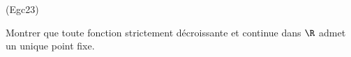 \begin{tiny}(Egc23)\end{tiny} Montrer que toute fonction strictement décroissante et continue dans $\R$ admet un unique point fixe. 